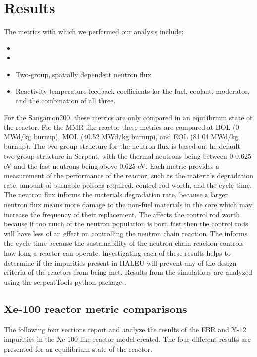 \section{Results}
The metrics with which we performed our analysis include:
\begin{itemize} 
        \item \keff 
        \item \betaEff
        \item Two-group, spatially dependent neutron flux
        \item Reactivity temperature feedback coefficients for the fuel, coolant, 
              moderator, and the combination of all three.
\end{itemize}

For the Sangamon200, these metrics are only compared in an equilibrium state
of the reactor. For the \gls{MMR}-like reactor these metrics 
are compared at \gls{BOL} (0 MWd/kg burnup), \gls{MOL} (40.52 MWd/kg burnup), 
and \gls{EOL} (81.04 MWd/kg burnup). The two-group structure for 
the neutron flux is based ont he default two-group structure in Serpent, 
with the thermal neutrons being between 0-0.625 eV and the fast 
neutrons being above 0.625 eV. Each metric provides a 
measurement of the performance of 
the reactor, such as the materials degradation rate, amount of burnable 
poisons required, control rod worth, and the cycle time. The neutron flux 
informs the materials degradation rate, because a larger neutron flux 
means more damage to the non-fuel materials in the core which may increase 
the frequency of their replacement. The \betaEff affects the control rod 
worth because if too much of the neutron population is born fast then 
the control rods will have less of an effect on controlling the neutron 
chain reaction. The \keff informs the cycle time because the sustainability 
of the neutron chain reaction controls how long a reactor can operate. 
Investigating 
each of these results helps to determine if the impurities 
present in \gls{HALEU} will prevent any of the design criteria of the 
reactors from being met. Results from the simulations are analyzed using 
the serpentTools python package \cite{johnson_serpenttools_2020}. 

\subsection{Xe-100 reactor metric comparisons}
The following four sections report and analyze the results of the 
\gls{EBR} and Y-12 impurities in the Xe-100-like reactor model 
created. The four different results are presented for an 
equilibrium state of the reactor.

